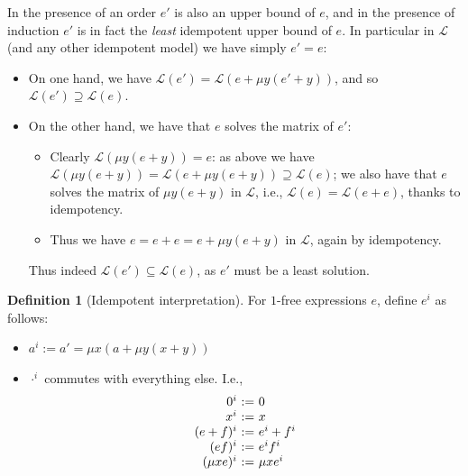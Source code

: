 \documentclass[a4paper,10pt]{amsart}
\newcommand{\df}{:=}
\theoremstyle{definition}
\newtheorem{definition}[theorem]{Definition}
\newcommand{\Lang}{\mathcal L}
\newcommand{\lang}[1]{\Lang(#1)}
\newcommand{\id}{\mathsf{init}}
\renewcommand{\id}[1]{#1^i}
\begin{document}
In the presence of an order $e'$ is also an upper bound of $e$, and in the presence of induction $e'$ is in fact the \emph{least} idempotent upper bound of $e$.
In particular in $\Lang $ (and any other idempotent model) we have simply $e'=e$:
\begin{itemize}
    \item On one hand, we have $\lang {e'} = \lang{e + \mu y (e'+y)}$, and so $\lang {e'} \supseteq \lang e$.
    \item On the other hand, we have that $e$ solves the matrix of $e'$:
    \begin{itemize}
        \item Clearly $\lang {\mu y (e+y)} = e$: as above we have $\lang {\mu y (e+y)} = \lang{e + \mu y (e+y)} \supseteq \lang e$; we also have that $e$ solves the matrix of $\mu y (e+y)$ in $\Lang$, i.e., $\lang e = \lang {e+e}$, thanks to idempotency.
        \item Thus we have $e = e + e = e + \mu y (e+y)$ in $\Lang$, again by idempotency.
    \end{itemize}
    Thus indeed $\lang {e'}\subseteq \lang e$, as $e'$ must be a least solution.
\end{itemize}

\begin{definition}
    [Idempotent interpretation]
    For $1$-free expressions $e$, define $\id e $ as follows:
\begin{itemize}
    \item $\id a \df a' = \mu x (a + \mu y (x+y))$
    \item $\id \cdot $ commutes with everything else. I.e.,
    \[
    \begin{array}{r@{\ \df\ }l}
         \id 0 & 0 \\
         \id x & x \\
         \id {(e+f)} & \id e + \id f \\
         \id {(ef)} & \id e \id f \\
         \id{(\mu x e)} & \mu x \id e
    \end{array}
    \]
\end{itemize}
\end{definition}
\end{document}

